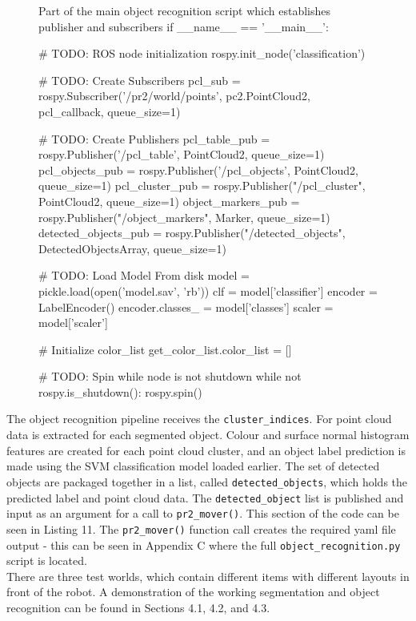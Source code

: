 \documentclass[a4paper]{article}
\begin{document}
\begin{figure}[h]\scriptsize
\begin{sexylisting}{Part of the main object recognition script which establishes publisher and subscribers}
if __name__ == '__main__':

    # TODO: ROS node initialization
    rospy.init_node('classification')

    # TODO: Create Subscribers
    pcl_sub = rospy.Subscriber('/pr2/world/points', pc2.PointCloud2, pcl_callback, queue_size=1)

    # TODO: Create Publishers
    pcl_table_pub = rospy.Publisher('/pcl_table', PointCloud2, queue_size=1)
    pcl_objects_pub = rospy.Publisher('/pcl_objects', PointCloud2, queue_size=1)
    pcl_cluster_pub = rospy.Publisher("/pcl_cluster", PointCloud2, queue_size=1)
    object_markers_pub = rospy.Publisher("/object_markers", Marker, queue_size=1)
    detected_objects_pub = rospy.Publisher("/detected_objects",
    DetectedObjectsArray, queue_size=1)

    # TODO: Load Model From disk
    model = pickle.load(open('model.sav', 'rb'))
    clf = model['classifier']
    encoder = LabelEncoder()
    encoder.classes_ = model['classes']
    scaler = model['scaler']

    # Initialize color_list
    get_color_list.color_list = []

    # TODO: Spin while node is not shutdown
    while not rospy.is_shutdown():
        rospy.spin()
\end{sexylisting}
\end{figure}

The object recognition pipeline receives the \verb|cluster_indices|. For point cloud data is extracted for each segmented object. Colour and surface normal histogram features are created for each point cloud cluster, and an object label prediction is made using the SVM classification model loaded earlier. The set of detected objects are packaged together in a list, called \verb|detected_objects|, which holds the predicted label and point cloud data. The \verb|detected_object| list is published and input as an argument for a call to \verb|pr2_mover()|. This section of the code can be seen in Listing 11. The \verb|pr2_mover()| function call creates the required yaml file output - this can be seen in Appendix C where the full \verb|object_recognition.py| script is located.\\

There are three test worlds, which contain different items with different layouts in front of the robot. A demonstration of the working segmentation and object recognition can be found in Sections 4.1, 4.2, and 4.3.
\end{document}
